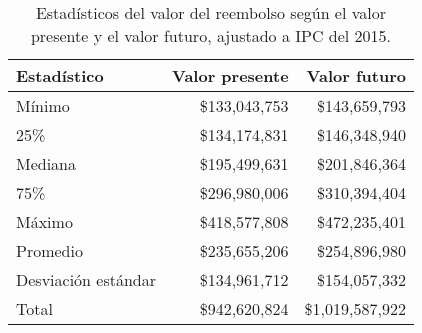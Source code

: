 \begin{table}[!htbp]
\centering
\caption{Estadísticos del valor del reembolso según el valor presente
y el valor futuro, ajustado a IPC del 2015.} 
\label{tab:reembolso}
\begin{tabular}{lrr}
  \hline
Estadístico & Valor presente & Valor futuro \\ 
  \hline
Mínimo & \$133,043,753 & \$143,659,793 \\ 
  25\% & \$134,174,831 & \$146,348,940 \\ 
  Mediana & \$195,499,631 & \$201,846,364 \\ 
  75\% & \$296,980,006 & \$310,394,404 \\ 
  Máximo & \$418,577,808 & \$472,235,401 \\ 
  Promedio & \$235,655,206 & \$254,896,980 \\ 
  Desviación estándar & \$134,961,712 & \$154,057,332 \\ 
  Total & \$942,620,824 & \$1,019,587,922 \\ 
   \hline
\end{tabular}
\end{table}

